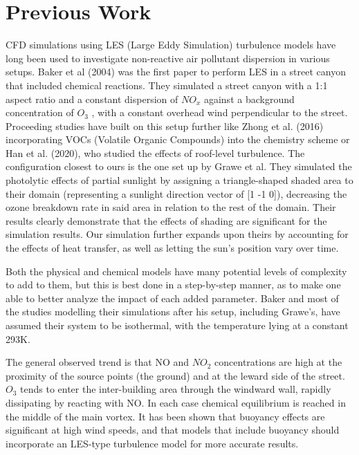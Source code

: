 
\chapter{Previous Work} %

\label{previouswork} %


CFD simulations using LES (Large Eddy Simulation) turbulence models have long been used to investigate non-reactive air pollutant dispersion in various setups. Baker et al (2004)\parencite{baker2004} was the first paper to perform LES in a street canyon that included chemical reactions. They simulated a street canyon with a 1:1 aspect ratio and a constant dispersion of $NO_x$ against a background concentration of $O_3$ , with a constant overhead wind perpendicular to the street. Proceeding studies have built on this setup further like Zhong et al. (2016)\parencite{zhong2016} incorporating VOCs (Volatile Organic Compounds) into the chemistry scheme or Han et al. (2020)\parencite{han2020}, who studied the effects of roof-level turbulence. The configuration closest to ours is the one set up by Grawe et al\parencite{Grawe}. They simulated the photolytic effects of partial sunlight by assigning a triangle-shaped shaded area to their domain (representing a sunlight direction vector of [1 -1 0]), decreasing the ozone breakdown rate in said area in relation to the rest of the domain. Their results clearly demonstrate that the effects of shading are significant for the simulation results. Our simulation further expands upon theirs by accounting for the effects of heat transfer, as well as letting the sun's position vary over time.

Both the physical and chemical models have many potential levels of complexity to add to them, but this is best done in a step-by-step manner, as to make one able to better analyze the impact of each added parameter. Baker and most of the studies modelling their simulations after his setup, including Grawe's, have assumed their system to be isothermal, with the temperature lying at a constant 293K.

The general observed trend is that NO and $NO_2$ concentrations are high at the proximity of the source points (the ground) and at the leward side of the street. $O_3$ tends to enter the inter-building area through the windward wall, rapidly dissipating by reacting with NO. In each case chemical equilibrium is reached in the middle of the main vortex. It has been shown that buoyancy effects are significant at high wind speeds, and that models that include buoyancy should incorporate an LES-type turbulence model for more accurate results\parencite{grawe2004}\parencite{tominaga}.